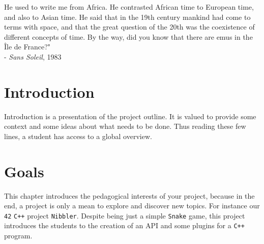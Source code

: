\documentclass{42-en}
\begin{document}
    He used to write me from Africa. He contrasted African time to European time, and also to Asian time. He said that in the 19th century mankind had come to terms with space, and that the great question of the 20th was the coexistence of different concepts of time. By the way, did you know that there are emus in the Île de France?"\\
    
    - \textit{Sans Soleil}, 1983\\

\chapter{Introduction}

    Introduction is a presentation of the project outline. It is valued
    to provide some context and some ideas about what needs to be done.
    Thus reading these few lines, a student has access to a global overview.



\chapter{Goals}

    This chapter introduces the pedagogical interests of your project,
    because in the end, a project is only a mean to explore and
    discover new topics. For instance our \texttt{42} \texttt{C++}
    project \texttt{Nibbler}. Despite being just a simple
    \texttt{Snake} game, this project introduces the students to the
    creation of an API and some plugins for a \texttt{C++} program.



\end{document}
